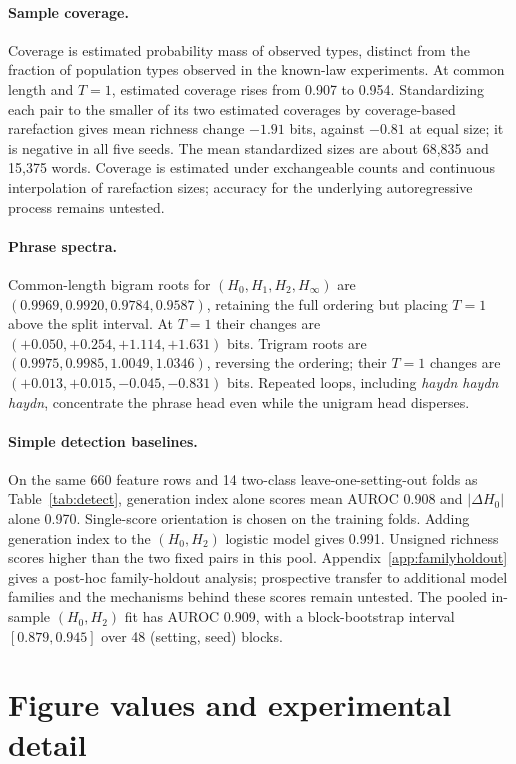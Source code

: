 \documentclass[10pt]{article}
\theoremstyle{plain}
\theoremstyle{definition}
\begin{document}
\paragraph{Sample coverage.} Coverage is estimated probability mass of observed types, distinct
from the fraction of population types observed in the known-law experiments. At common length
and $T=1$, estimated coverage rises from 0.907 to 0.954. Standardizing each pair to the smaller
of its two estimated coverages by coverage-based rarefaction
\citep{chao2012coverage,chao2014rarefaction} gives mean richness change $-1.91$ bits, against
$-0.81$ at equal size; it is negative in all five seeds. The mean standardized sizes are about
68,835 and 15,375 words. Coverage is estimated under exchangeable counts and continuous
interpolation of rarefaction sizes; accuracy for the underlying autoregressive process remains
untested.

\paragraph{Phrase spectra.} Common-length bigram roots for $(H_0,H_1,H_2,H_\infty)$ are
$(0.9969,0.9920,0.9784,0.9587)$, retaining the full ordering but placing $T=1$ above the split
interval. At $T=1$ their changes are $(+0.050,+0.254,+1.114,+1.631)$ bits. Trigram roots are
$(0.9975,0.9985,1.0049,1.0346)$, reversing the ordering; their $T=1$ changes are
$(+0.013,+0.015,-0.045,-0.831)$ bits. Repeated loops, including \emph{haydn haydn haydn},
concentrate the phrase head even while the unigram head disperses.

\paragraph{Simple detection baselines.} On the same 660 feature rows and 14 two-class
leave-one-setting-out folds as Table~\ref{tab:detect}, generation index alone scores mean
AUROC 0.908 and $|\Delta H_0|$ alone 0.970. Single-score orientation is chosen on the training
folds. Adding generation index to the $(H_0,H_2)$ logistic model gives 0.991. Unsigned richness scores higher than the two fixed pairs in this pool.
Appendix~\ref{app:familyholdout} gives a post-hoc family-holdout analysis; prospective transfer
to additional model families and the mechanisms behind these scores remain untested. The pooled in-sample $(H_0,H_2)$ fit has AUROC 0.909, with a
block-bootstrap interval $[0.879,0.945]$ over 48 (setting, seed) blocks.

\section{Figure values and experimental detail}
\label{app:figvals}
\end{document}
